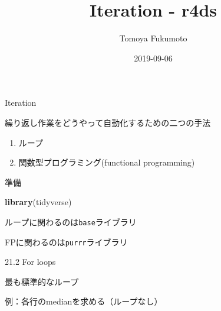 \documentclass[ignorenonframetext,]{beamer}
\title{Iteration - r4ds}
\author{Tomoya Fukumoto}
\date{2019-09-06}
\newenvironment{Shaded}{\begin{snugshade}}{\end{snugshade}}
\newcommand{\KeywordTok}[1]{\textcolor[rgb]{0.13,0.29,0.53}{\textbf{#1}}}
\newcommand{\DataTypeTok}[1]{\textcolor[rgb]{0.13,0.29,0.53}{#1}}
\newcommand{\DecValTok}[1]{\textcolor[rgb]{0.00,0.00,0.81}{#1}}
\newcommand{\StringTok}[1]{\textcolor[rgb]{0.31,0.60,0.02}{#1}}
\newcommand{\OperatorTok}[1]{\textcolor[rgb]{0.81,0.36,0.00}{\textbf{#1}}}
\newcommand{\NormalTok}[1]{#1}
\providecommand{\tightlist}{%
  \setlength{\itemsep}{0pt}\setlength{\parskip}{0pt}}
\begin{document}
\frame{\titlepage}

\begin{frame}{Iteration}

繰り返し作業をどうやって自動化するための二つの手法

\begin{enumerate}
\def\labelenumi{\arabic{enumi}.}
\tightlist
\item
  ループ
\item
  関数型プログラミング(functional programming)
\end{enumerate}

\end{frame}

\begin{frame}[fragile]{準備}

\begin{Shaded}
\begin{Highlighting}[]
\KeywordTok{library}\NormalTok{(tidyverse)}
\end{Highlighting}
\end{Shaded}

ループに関わるのは\texttt{base}ライブラリ

FPに関わるのは\texttt{purrr}ライブラリ

\end{frame}

\begin{frame}{21.2 For loops}

最も標準的なループ

\end{frame}

\begin{frame}[fragile]{例：各行のmedianを求める（ループなし）}

\begin{Shaded}
\end{Shaded}

\end{frame}
\end{document}
